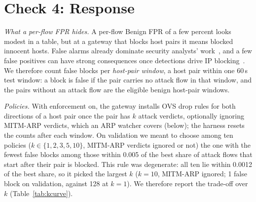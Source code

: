 \section{Check 4: Response}\label{sec:response}

\emph{What a per-flow FPR hides.} A per-flow Benign FPR of a few percent looks modest in a table, but at a gateway that blocks host pairs it means blocked innocent hosts. False alarms already dominate security analysts' work~\cite{alahmadi2022falsepositives}, and a few false positives can have strong consequences once detections drive IP blocking~\cite{garcia2023labeling,akbari2020atmos}. We therefore count false blocks per \emph{host-pair window}, a host pair within one 60\,s test window: a block is false if the pair carries no attack flow in that window, and the pairs without an attack flow are the eligible benign host-pair windows.

\emph{Policies.} With enforcement on, the gateway installs OVS drop rules for both directions of a host pair once the pair has $k$ attack verdicts, optionally ignoring MITM-ARP verdicts, which an ARP watcher covers (below); the harness resets the counts after each window. On validation we meant to choose among ten policies ($k\in\{1,2,3,5,10\}$, MITM-ARP verdicts ignored or not) the one with the fewest false blocks among those within 0.005 of the best share of attack flows that start after their pair is blocked. This rule was degenerate: all ten lie within 0.0012 of the best share, so it picked the largest $k$ ($k=10$, MITM-ARP ignored; 1 false block on validation, against 128 at $k=1$). We therefore report the trade-off over $k$ (Table~\ref{tab:kcurve}).

